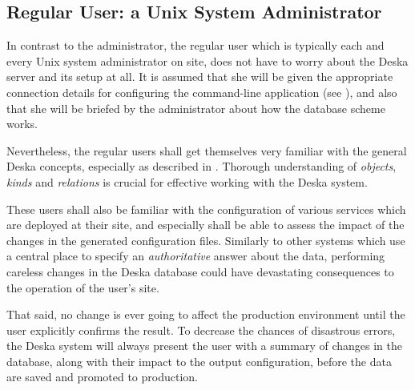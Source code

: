 \documentclass[deska]{subfiles}
\begin{document}
\subsection{Regular User: a Unix System Administrator}

In contrast to the administrator, the regular user which is typically each and every Unix system administrator on site,
does not have to worry about the Deska server and its setup at all.  It is assumed that she will be given the
appropriate connection details for configuring the command-line application (see ), and
also that she will be briefed by the administrator about how the database scheme works.

Nevertheless, the regular users shall get themselves very familiar with the general Deska concepts, especially as
described in .  Thorough understanding of {\em objects}, {\em kinds} and {\em
relations} is crucial for effective working with the Deska system.

These users shall also be familiar with the configuration of various services which are deployed at their site, and
especially shall be able to assess the impact of the changes in the generated configuration files.  Similarly to other
systems which use a central place to specify an {\em authoritative} answer about the data, performing careless changes
in the Deska database could have devastating consequences to the operation of the user's site.

That said, no change is ever going to affect the production environment until the user explicitly confirms the result.
To decrease the chances of disastrous errors, the Deska system will always present the user with a summary of changes in
the database, along with their impact to the output configuration, before the data are saved and promoted to production.
\end{document}
